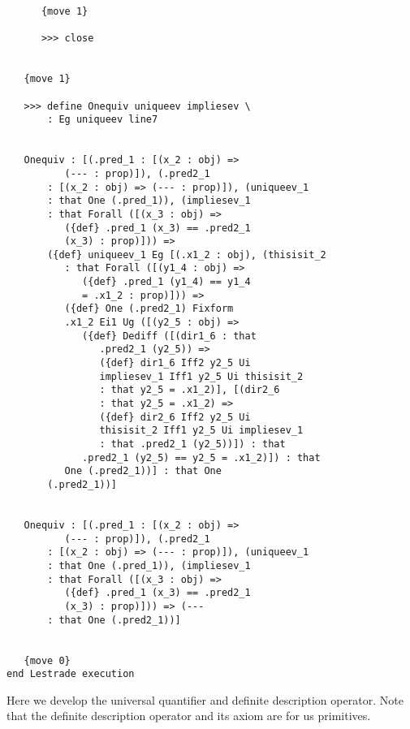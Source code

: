 \documentclass[12pt]{article}
\begin{document}
\begin{verbatim}
      {move 1}

      >>> close


   {move 1}

   >>> define Onequiv uniqueev impliesev \
       : Eg uniqueev line7


   Onequiv : [(.pred_1 : [(x_2 : obj) => 
          (--- : prop)]), (.pred2_1 
       : [(x_2 : obj) => (--- : prop)]), (uniqueev_1 
       : that One (.pred_1)), (impliesev_1 
       : that Forall ([(x_3 : obj) => 
          ({def} .pred_1 (x_3) == .pred2_1 
          (x_3) : prop)])) => 
       ({def} uniqueev_1 Eg [(.x1_2 : obj), (thisisit_2 
          : that Forall ([(y1_4 : obj) => 
             ({def} .pred_1 (y1_4) == y1_4 
             = .x1_2 : prop)])) => 
          ({def} One (.pred2_1) Fixform 
          .x1_2 Ei1 Ug ([(y2_5 : obj) => 
             ({def} Dediff ([(dir1_6 : that 
                .pred2_1 (y2_5)) => 
                ({def} dir1_6 Iff2 y2_5 Ui 
                impliesev_1 Iff1 y2_5 Ui thisisit_2 
                : that y2_5 = .x1_2)], [(dir2_6 
                : that y2_5 = .x1_2) => 
                ({def} dir2_6 Iff2 y2_5 Ui 
                thisisit_2 Iff1 y2_5 Ui impliesev_1 
                : that .pred2_1 (y2_5))]) : that 
             .pred2_1 (y2_5) == y2_5 = .x1_2)]) : that 
          One (.pred2_1))] : that One 
       (.pred2_1))]


   Onequiv : [(.pred_1 : [(x_2 : obj) => 
          (--- : prop)]), (.pred2_1 
       : [(x_2 : obj) => (--- : prop)]), (uniqueev_1 
       : that One (.pred_1)), (impliesev_1 
       : that Forall ([(x_3 : obj) => 
          ({def} .pred_1 (x_3) == .pred2_1 
          (x_3) : prop)])) => (--- 
       : that One (.pred2_1))]


   {move 0}
end Lestrade execution
\end{verbatim}

Here we develop the universal quantifier and definite description operator.  Note that the definite description operator and its axiom are for us primitives.
\end{document}
